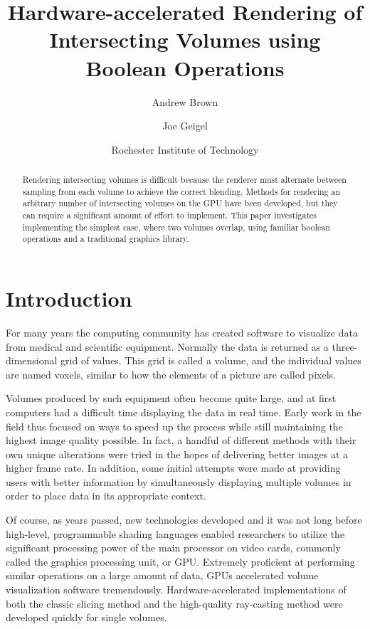 \documentclass{article}
\begin{document}
\pagestyle{empty}

\title{Hardware-accelerated Rendering of Intersecting Volumes using Boolean Operations}
\author{Andrew Brown \and Joe Geigel}
\date{\small{Rochester Institute of Technology}}
\maketitle

\begin{abstract}
Rendering intersecting volumes is difficult because the renderer must alternate
between sampling from each volume to achieve the correct blending.  Methods for
rendering an arbitrary number of intersecting volumes on the GPU have been
developed, but they can require a significant amount of effort to implement.
This paper investigates implementing the simplest case, where two volumes
overlap, using familiar boolean operations and a traditional graphics library.
\end{abstract}

\pagestyle{plain}

\section{Introduction}

For many years the computing community has created software to visualize data
from medical and scientific equipment.  Normally the data is returned as a
three-dimensional grid of values.  This grid is called a volume, and the
individual values are named voxels, similar to how the elements of a picture are
called pixels.

Volumes produced by such equipment often become quite large, and at first
computers had a difficult time displaying the data in real time.  Early work in
the field thus focused on ways to speed up the process while still maintaining
the highest image quality possible.  In fact, a handful of different methods
with their own unique alterations were tried in the hopes of delivering better
images at a higher frame rate.  In addition, some initial attempts were made at
providing users with better information by simultaneously displaying multiple
volumes in order to place data in its appropriate context.

Of course, as years passed, new technologies developed and it was not long
before high-level, programmable shading languages enabled researchers to utilize
the significant processing power of the main processor on video cards, commonly
called the graphics processing unit, or GPU.  Extremely proficient at performing
similar operations on a large amount of data, GPUs accelerated volume
visualization software tremendously.  Hardware-accelerated implementations of
both the classic slicing method and the high-quality ray-casting method were
developed quickly for single volumes.
\end{document}
